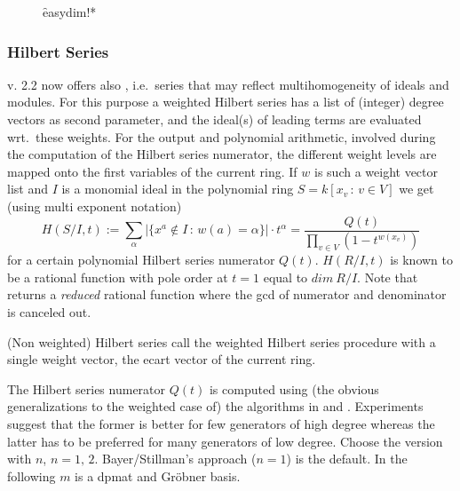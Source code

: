 \begin{description}
\item[]
  \begin{syntax}
    \f{easydim!*} 
  \end{syntax}
  \hypertarget{procedure:EASYDIM!*}{}
\end{description}

\subsubsection{Hilbert Series}

 v. 2.2 now offers also , i.e.\
series that may reflect multihomogeneity of ideals and modules. For
this purpose
a weighted Hilbert series has a list of (integer) degree vectors
as second parameter, and the ideal(s) of leading terms are evaluated
wrt.\ these weights. For the output and polynomial arithmetic,
involved during the computation of the Hilbert series numerator, the
different weight levels are mapped onto the first variables of the
current ring. If $w$ is such a weight vector list and $I$ is a
monomial ideal in the polynomial ring $S=k[x_v\,:\,v\in V]$ we get
(using multi exponent notation)
\[H(S/I,t) := \sum_{\alpha}{|\{x^a\not\in I\,:\,w(a)=\alpha\}|\cdot
t^\alpha} = \frac{Q(t)}{\prod_{v\in V}{\left(1-t^{w(x_v)}\right)} }\]
for a certain polynomial Hilbert series numerator $Q(t)$. $H(R/I,t)$
is known to be a rational function with pole order at $t=1$ equal to
$dim\ R/I$. Note that \ind{WeightedHilbertSeries} returns a
\emph{reduced} rational function where the gcd of numerator and denominator
is canceled out.

(Non weighted) Hilbert series call the weighted Hilbert series
procedure with a single weight vector, the ecart vector of the current
ring.

The Hilbert series numerator $Q(t)$ is computed using (the obvious
generalizations to the weighted case of) the algorithms in \cite{BayerStillman:92}
and \cite{Bigatti:93}. Experiments suggest that the former is better for few
generators of high degree whereas the latter has to be preferred for
many generators of low degree. Choose the version with
 $n$, $n=1,\,2$. Bayer/Stillman's approach ($n=1$)
is the default. In the following $m$ is a dpmat and Gr\"obner basis.

